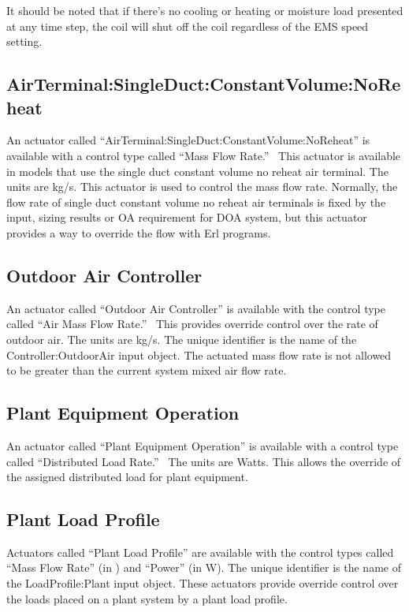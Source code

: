 It should be noted that if there's no cooling or heating or moisture load presented at any time step, the coil will shut off the coil regardless of the EMS speed setting.


\subsection{AirTerminal:SingleDuct:ConstantVolume:NoReheat}\label{airTerminalsingleductconstantvolumenoreheat}

An actuator called ``AirTerminal:SingleDuct:ConstantVolume:NoReheat'' is available with a control type called ``Mass Flow Rate.''~ This actuator is available in models that use the single duct constant volume no reheat air terminal. The units are kg/s. This actuator is used to control the mass flow rate. Normally, the flow rate of single duct constant volume no reheat air terminals is fixed by the input, sizing results or OA requirement for DOA system, but this actuator provides a way to override the flow with Erl programs.

\subsection{Outdoor Air Controller}\label{outdoor-air-controller}

An actuator called ``Outdoor Air Controller'' is available with the control type called ``Air Mass Flow Rate.'' ~This provides override control over the rate of outdoor air. The units are kg/s. The unique identifier is the name of the Controller:OutdoorAir input object. The actuated mass flow rate is not allowed to be greater than the current system mixed air flow rate.

\subsection{Plant Equipment Operation}\label{plant-equipment-operation}

An actuator called ``Plant Equipment Operation'' is available with a control type called ``Distributed Load Rate.''~ The units are Watts.  This allows the override of the assigned distributed load for plant equipment.

\subsection{Plant Load Profile}\label{plant-load-profile}

Actuators called ``Plant Load Profile'' are available with the control types called ``Mass Flow Rate'' (in \si{\massFlowRate}) and ``Power'' (in W). The unique identifier is the name of the LoadProfile:Plant input object. These actuators provide override control over the loads placed on a plant system by a plant load profile.

